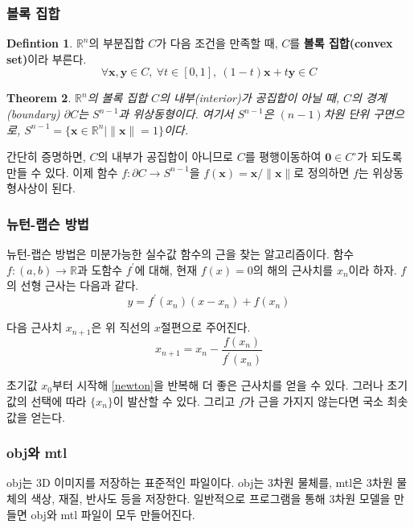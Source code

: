 \documentclass[10pt]{gshs-report-v2.0}
\theoremstyle{theorem}
\newtheorem{theorem}{Theorem}[section]
\theoremstyle{lemma}
\theoremstyle{definition}
\newtheorem{definition}[theorem]{Defintion}
\begin{document}
\subsubsection{볼록 집합}
\begin{definition}
	$\mathbb{R}^n$의 부분집합 $C$가 다음 조건을 만족할 때, $C$를 \textbf{볼록 집합(convex set)}이라 부른다. 
	\begin{equation*}
		\forall \mathbf{x}, \mathbf{y} \in C,\ \forall t \in [0, 1],\ (1-t)\mathbf{x}+t\mathbf{y} \in C
	\end{equation*}
\end{definition}

\begin{theorem} \label{homeo}
	$\mathbb{R}^n$의 볼록 집합 $C$의 내부(interior)가 공집합이 아닐 때, $C$의 경계(boundary) $\partial C$는 $S^{n-1}$과 위상동형이다. 여기서 $S^{n-1}$은 $(n-1)$차원 단위 구면으로, $S^{n-1}=\{ \mathbf{x}\in\mathbb{R}^n \mid \| \mathbf{x} \| = 1 \}$이다.
\end{theorem}

간단히 증명하면, $C$의 내부가 공집합이 아니므로 $C$를 평행이동하여 $\mathbf{0}\in C^\circ$가 되도록 만들 수 있다. 이제 함수 $f\colon\partial C \to S^{n-1}$을 $f(\mathbf{x})=\mathbf{x}/\|\mathbf{x}\|$로 정의하면 $f$는 위상동형사상이 된다. 

\subsubsection{뉴턴-랩슨 방법}
뉴턴-랩슨 방법은 미분가능한 실수값 함수의 근을 찾는 알고리즘이다. 함수 $f\colon(a, b)\to\mathbb{R}$과 도함수 $f^\prime$에 대해, 현재 $f(x)=0$의 해의 근사치를 $x_n$이라 하자. $f$의 선형 근사는 다음과 같다.
\begin{equation*}
	y=f^\prime(x_n)(x-x_n)+f(x_n)
\end{equation*}

다음 근사치 $x_{n+1}$은 위 직선의 $x$절편으로 주어진다.
\begin{equation} \label{newton}
	x_{n+1}=x_n-\frac{f(x_{n})}{f^\prime(x_n)}
\end{equation}

초기값 $x_0$부터 시작해 \cref{newton}을 반복해 더 좋은 근사치를 얻을 수 있다. 그러나 초기값의 선택에 따라 $\{x_n\}$이 발산할 수 있다. 그리고 $f$가 근을 가지지 않는다면 국소 최솟값을 얻는다.

\subsubsection{obj와 mtl}
obj는 3D 이미지를 저장하는 표준적인 파일이다. obj는 3차원 물체를, mtl은 3차원 물체의 색상, 재질, 반사도 등을 저장한다. 일반적으로 프로그램을 통해 3차원 모델을 만들면 obj와 mtl 파일이 모두 만들어진다. 
\end{document}
